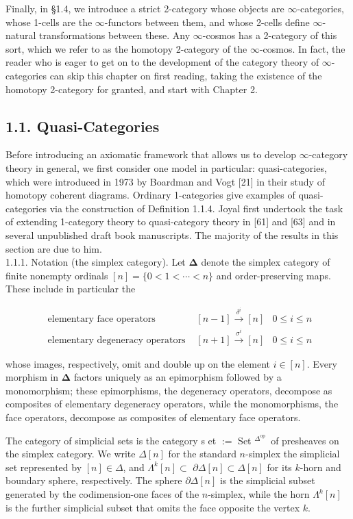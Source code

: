 \documentclass[10pt]{article}
\begin{document}
Finally, in §1.4, we introduce a strict 2-category whose objects are $\infty$-categories, whose 1-cells are the $\infty$-functors between them, and whose 2-cells define $\infty$-natural transformations between these. Any $\infty$-cosmos has a 2-category of this sort, which we refer to as the homotopy 2-category of the $\infty$-cosmos. In fact, the reader who is eager to get on to the development of the category theory of $\infty$-categories can skip this chapter on first reading, taking the existence of the homotopy 2-category for granted, and start with Chapter 2.

\subsection*{1.1. Quasi-Categories}
Before introducing an axiomatic framework that allows us to develop $\infty$-category theory in general, we first consider one model in particular: quasi-categories, which were introduced in 1973 by Boardman and Vogt [21] in their study of homotopy coherent diagrams. Ordinary 1-categories give examples of quasi-categories via the construction of Definition 1.1.4. Joyal first undertook the task of extending 1-category theory to quasi-category theory in [61] and [63] and in several unpublished draft book manuscripts. The majority of the results in this section are due to him.\\
1.1.1. Notation (the simplex category). Let $\boldsymbol{\Delta}$ denote the simplex category of finite nonempty ordinals $[n]=\{0<1<\cdots<n\}$ and order-preserving maps. These include in particular the

$$
\begin{array}{ccc}
\text { elementary face operators } & {[n-1] \stackrel{\delta^{i}}{\rightarrow}[n]} & 0 \leq i \leq n \\
\text { elementary degeneracy operators } & {[n+1] \xrightarrow{\sigma^{i}}[n]} & 0 \leq i \leq n
\end{array}
$$

whose images, respectively, omit and double up on the element $i \in[n]$. Every morphism in $\boldsymbol{\Delta}$ factors uniquely as an epimorphism followed by a monomorphism; these epimorphisms, the degeneracy operators, decompose as composites of elementary degeneracy operators, while the monomorphisms, the face operators, decompose as composites of elementary face operators.

The category of simplicial sets is the category s et $:=$ Set ${ }^{\Delta^{\text {op }}}$ of presheaves on the simplex category. We write $\Delta[n]$ for the standard $n$-simplex the simplicial set represented by $[n] \in \Delta$, and $\Lambda^{k}[n] \subset$ $\partial \Delta[n] \subset \Delta[n]$ for its $k$-horn and boundary sphere, respectively. The sphere $\partial \Delta[n]$ is the simplicial subset generated by the codimension-one faces of the $n$-simplex, while the horn $\Lambda^{k}[n]$ is the further simplicial subset that omits the face opposite the vertex $k$.
\end{document}
